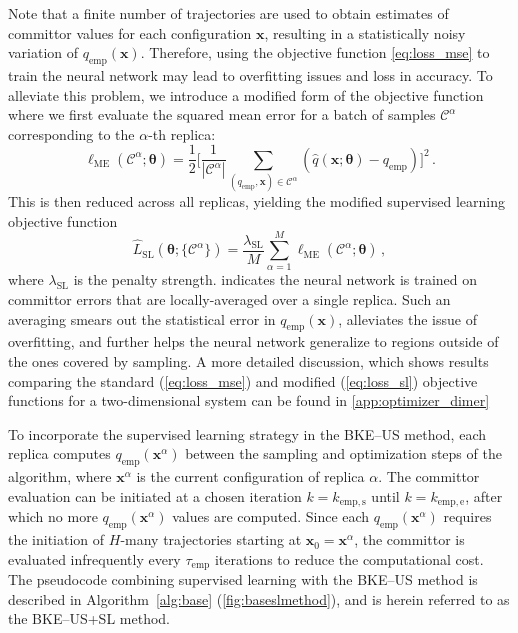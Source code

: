 \documentclass{article}
\numberwithin{equation}{section}
\def\*#1{\mathbf{#1}}
\theoremstyle{definition}
\theoremstyle{remark}
\def\thetab{\boldsymbol{\theta}}
\begin{document}
Note that a finite number of trajectories are used to obtain estimates of committor values for each configuration $\* x$, resulting in a statistically noisy variation of $q_\mathrm{emp}(\* x)$. Therefore, using the objective function \cref{eq:loss_mse} to train the neural network may lead to overfitting issues and loss in accuracy. 
To alleviate this problem, we introduce a modified form of the objective function where we first evaluate the squared mean error for a batch of samples $\mathcal{C}^{\alpha}$ corresponding to the $\alpha$-th replica: 
\begin{equation}
    \ell_{\mathrm{ME}}(\mathcal{C}^{\alpha}; \thetab) = \frac{1}{2}\Bigg[\frac{1}{|\mathcal{C}^{\alpha}|} \sum_{ ( q_\mathrm{emp}, \* x ) \in \mathcal{C}^{\alpha}}( \hat{q}(\* x; \thetab) - q_\mathrm{emp} ) \Bigg]^2 \,.
\end{equation}
This is then reduced across all replicas, yielding the modified supervised learning objective function
\begin{equation}
    \hat{L}_\mathrm{SL}(\thetab; \{ \mathcal{C}^\alpha \}) = \frac{\lambda_{\mathrm{SL}}}{ M} \sum_{\alpha=1}^M  \ell_{\mathrm{ME}}(\mathcal{C}^{\alpha}; \thetab) \label{eq:loss_sl} \,,
\end{equation}
where $ \lambda_{\mathrm{SL}} $ is the penalty strength. 
 indicates the neural network is trained on committor errors that are locally-averaged over a single replica. Such an averaging smears out the statistical error in $ q_\mathrm{emp}( \* x) $, alleviates the issue of overfitting, and further helps the neural network generalize to regions outside of the ones covered by sampling. A more detailed discussion, which shows results comparing the standard (\cref{eq:loss_mse}) and modified (\cref{eq:loss_sl}) objective functions for a two-dimensional system can be found in \cref{app:optimizer_dimer}


To incorporate the supervised learning strategy in the BKE--US method, each replica computes $q_\mathrm{emp}(\* x^{\alpha} )$ between the sampling and optimization steps of the algorithm, where $\* x^\alpha $ is the current configuration of replica $ \alpha $. 
The committor evaluation can be initiated at a chosen iteration $ k=k_\mathrm{emp,s}$ until $k= k_\mathrm{emp,e} $, after which no more $ q_\mathrm{emp}(\* x^{\alpha} )$ values are computed.
Since each $q_\mathrm{emp}(\* x^{\alpha} )$ requires the initiation of $H$-many trajectories starting at $\* x_0 = \* x^\alpha$, the committor is evaluated infrequently every $ \tau_\mathrm{emp}$ iterations to reduce the computational cost.
The pseudocode combining supervised learning with the BKE--US method is described in Algorithm~\ref{alg:base} (\cref{fig:baseslmethod}), and is herein referred to as the BKE--US+SL method.
\end{document}
